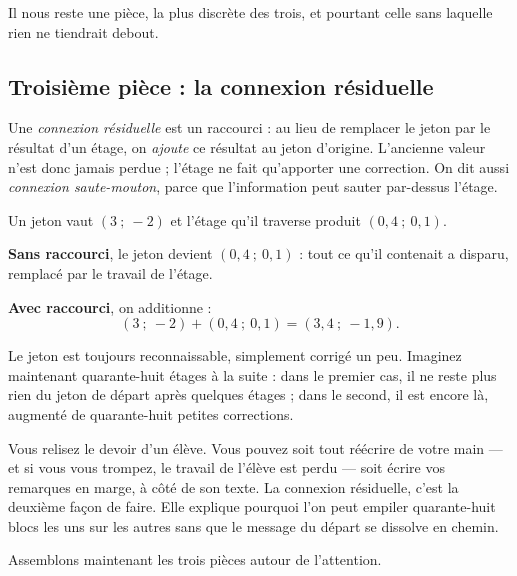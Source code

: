 Il nous reste une pièce, la plus discrète des trois, et pourtant celle sans
laquelle rien ne tiendrait debout.

\subsection*{Troisième pièce : la connexion résiduelle}

\begin{definition}
Une \emph{connexion résiduelle} est un raccourci : au lieu de remplacer le
jeton par le résultat d'un étage, on \emph{ajoute} ce résultat au jeton
d'origine. L'ancienne valeur n'est donc jamais perdue ; l'étage ne fait
qu'apporter une correction. On dit aussi \emph{connexion saute-mouton},
parce que l'information peut sauter par-dessus l'étage.
\end{definition}

\begin{exemple}
Un jeton vaut $(3 \ ; \ -2)$ et l'étage qu'il traverse produit
$(0{,}4 \ ; \ 0{,}1)$.

\textbf{Sans raccourci}, le jeton devient $(0{,}4 \ ; \ 0{,}1)$ : tout ce
qu'il contenait a disparu, remplacé par le travail de l'étage.

\textbf{Avec raccourci}, on additionne :
\[ (3 \ ; \ -2) + (0{,}4 \ ; \ 0{,}1) = (3{,}4 \ ; \ -1{,}9). \]

Le jeton est toujours reconnaissable, simplement corrigé un peu. Imaginez
maintenant quarante-huit étages à la suite : dans le premier cas, il ne reste
plus rien du jeton de départ après quelques étages ; dans le second, il est
encore là, augmenté de quarante-huit petites corrections.
\end{exemple}

\begin{intuition}
Vous relisez le devoir d'un élève. Vous pouvez soit tout réécrire de votre
main — et si vous vous trompez, le travail de l'élève est perdu — soit
écrire vos remarques en marge, à côté de son texte. La connexion résiduelle,
c'est la deuxième façon de faire. Elle explique pourquoi l'on peut empiler
quarante-huit blocs les uns sur les autres sans que le message du départ se
dissolve en chemin.
\end{intuition}

Assemblons maintenant les trois pièces autour de l'attention.

